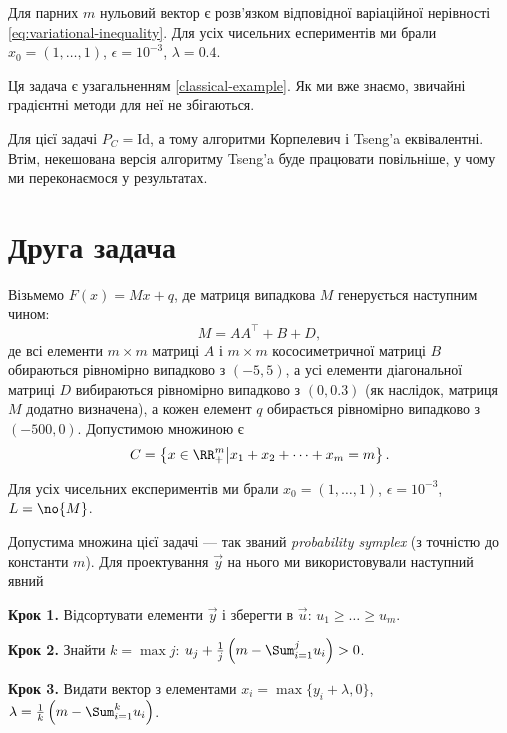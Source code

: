 Для парних $m$ нульовий вектор є розв'язком відповідної варіаційної нерівності \eqref{eq:variational-inequality}. Для усіх чисельних еспериментів ми брали $x_0 = (1, \dots, 1)$, $\epsilon = 10^{-3}$, $\lambda = 0.4$. 

\begin{remark}
    Ця задача є узагальненням \ref{classical-example}. Як ми вже знаємо, звичайні градієнтні методи для неї не збігаються.
\end{remark}

\begin{remark}
    Для цієї задачі $P_C = \text{Id}$, а тому алгоритми Корпелевич і Tseng'a еквівалентні. Втім, некешована версія алгоритму Tseng'a буде працювати повільніше, у чому ми переконаємося у результатах.
\end{remark}

\section{Друга задача}

Візьмемо $F(x) = M x + q$, де матриця випадкова $M$ генерується наступним чином:
\begin{equation}
    M = A A^\intercal + B + D,
\end{equation}
де всі елементи $m \times m$ матриці $A$ і $m \times m$ кососиметричної матриці $B$ обираються рівномірно випадково з $(-5, 5)$, а усі елементи діагональної матриці $D$ вибираються рівномірно випадково з $(0, 0.3)$ (як наслідок, матриця $M$ додатно визначена), а кожен елемент $q$ обирається рівномірно випадково з $(-500, 0)$. Допустимою множиною є 
\begin{equation}
    C = \left\{ x \in \RR_+^m \middle| x_1 + x_2 + \dots + x_m = m \right\}.
\end{equation}

Для усіх чисельних експериментів ми брали $x_0 = (1, \dots, 1)$, $\epsilon = 10^{-3}$, $L = \no{M}$. \medskip

Допустима множина цієї задачі --- так званий \emph{probability symplex} (з точністю до константи $m$). Для проектування $\vec y$ на нього ми використовували наступний явний
\begin{algorithm}\nothing

    \textbf{Крок 1.} Відсортувати елементи $\vec y$ і зберегти в $\vec u$: $u_1 \ge \dots \ge u_m$. \medskip
        
    \textbf{Крок 2.} Знайти $k = \max j$: $u_j + \frac{1}{j} \left( m - \Sum_{i = 1}^j u_i \right) > 0$. \medskip
        
    \textbf{Крок 3.} Видати вектор з елементами $x_i = \max\{y_i + \lambda, 0\}$, $\lambda = \frac{1}{k} \left( m - \Sum_{i = 1}^k u_i \right)$.
\end{algorithm}

